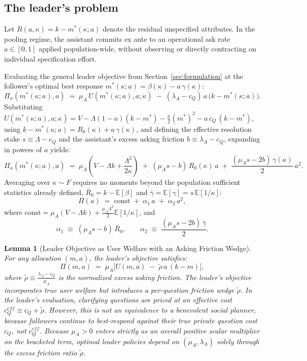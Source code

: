 \documentclass[11pt]{article}
\newtheorem{lemma}{Lemma}
\begin{document}
\subsection{The leader's problem}

Let $R(a,\kappa)=k-m^*(\kappa;a)$ denote the residual unspecified attributes. In the pooling regime, the assistant commits ex ante to an operational ask rate $a \in [0,1]$ applied population-wide, without observing or directly contracting on individual specification effort.

Evaluating the general leader objective from Section~\ref{sec:formulation} at the follower's optimal best response $m^*(\kappa;a) = \beta(\kappa) - a\,\gamma(\kappa)$:
\[
\Pi_\kappa(m^*(\kappa;a),a) \;=\; \mu_A\, U(m^*(\kappa;a),a;\kappa) \;-\; (\lambda_A - c_Q)\, a\,\big(k - m^*(\kappa;a)\big).
\]
Substituting $U(m^*(\kappa;a),a;\kappa) = V - \Lambda(1-a)(k-m^*) - \frac{\kappa}{2}(m^*)^2 - a\,c_Q\,(k-m^*)$, using $k - m^*(\kappa;a) = R_0(\kappa) + a\,\gamma(\kappa)$, and defining the effective resolution stake $s \equiv \Lambda - c_Q$ and the assistant's excess asking friction $b \equiv \lambda_A - c_Q$, expanding in powers of $a$ yields:
\[
\Pi_\kappa(m^*(\kappa;a),a) \;=\; \mu_A \left( V - \Lambda k + \frac{\Lambda^2}{2\kappa} \right) \;+\; (\mu_A s - b)\, R_0(\kappa)\, a \;+\; \frac{(\mu_A s - 2b)\,\gamma(\kappa)}{2}\, a^2.
\]
Averaging over $\kappa \sim F$ requires no moments beyond the population sufficient statistics already defined, $\bar R_0 = k - \mathbb{E}[\beta]$ and $\bar\gamma = \mathbb{E}[\gamma] = s\,\mathbb{E}[1/\kappa]$:
\[
\Pi(a) \;=\; \text{const} \;+\; \alpha_1\, a \;+\; \alpha_2\, a^2,
\]
where $\text{const} = \mu_A(V - \Lambda k) + \frac{\mu_A \Lambda^2}{2}\mathbb{E}[1/\kappa]$, and
\[
\alpha_1 \;\equiv\; (\mu_A s - b)\,\bar R_0, \qquad \alpha_2 \;\equiv\; \frac{(\mu_A s - 2b)\,\bar\gamma}{2}.
\]

\begin{lemma}[Leader Objective as User Welfare with an Asking Friction Wedge]
\label{lem:effective-cost}
For any allocation $(m, a)$, the leader's objective satisfies:
\[
\Pi(m, a) \;=\; \mu_A \Big[ U(m, a) \;-\; \tilde\rho\, a\, (k - m) \Big],
\]
where $\tilde\rho \equiv \frac{\lambda_A - c_Q}{\mu_A}$ is the normalized excess asking friction. The leader's objective incorporates true user welfare but introduces a per-question friction wedge $\tilde\rho$. In the leader's evaluation, clarifying questions are priced at an effective cost $c_Q^{eff} \equiv c_Q + \tilde\rho$. However, this is not an equivalence to a benevolent social planner, because followers continue to best-respond against their true private question cost $c_Q$, not $c_Q^{eff}$. Because $\mu_A > 0$ enters strictly as an overall positive scalar multiplier on the bracketed term, optimal leader policies depend on $(\mu_A, \lambda_A)$ solely through the excess friction ratio $\tilde\rho$.
\end{lemma}
\end{document}
